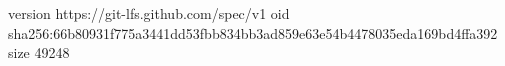 version https://git-lfs.github.com/spec/v1
oid sha256:66b80931f775a3441dd53fbb834bb3ad859e63e54b4478035eda169bd4ffa392
size 49248
